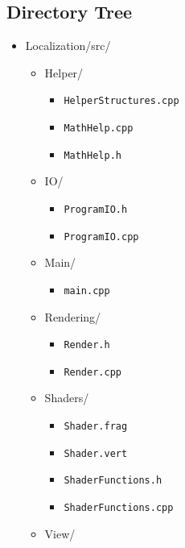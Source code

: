 \documentclass[a4paper,11pt]{article}
\begin{document}
        \subsection{Directory Tree}
        \begin{itemize}
        \item Localization/src/
            \begin{itemize}
            \item Helper/
                \begin{itemize}
                    \item \texttt{HelperStructures.cpp}
                    \item \texttt{MathHelp.cpp}
                    \item \texttt{MathHelp.h}
                \end{itemize}
            \item IO/
                \begin{itemize}
                    \item \texttt{ProgramIO.h}
                    \item \texttt{ProgramIO.cpp}
                \end{itemize}
            \item Main/
                \begin{itemize}
                    \item \texttt{main.cpp}
                \end{itemize}
            \item Rendering/
                \begin{itemize}
                    \item \texttt{Render.h}
                    \item \texttt{Render.cpp}
                \end{itemize}
            \item Shaders/
                \begin{itemize}
                    \item \texttt{Shader.frag}
                    \item \texttt{Shader.vert}
                    \item \texttt{ShaderFunctions.h}
                    \item \texttt{ShaderFunctions.cpp}
                \end{itemize}
            \item View/
                \begin{itemize}

\end{itemize}
\end{itemize}
\end{itemize}
\end{document}
